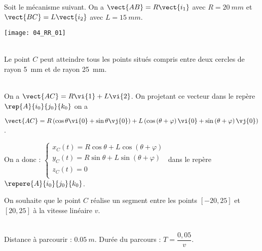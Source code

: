 \normaltrue
\correctionfalse


\setcounter{question}{0}
\ifcorrection
\else
{}
\fi

\ifprof
\else
Soit le mécanisme suivant. On a $\vect{AB}=R\vect{i_1}$ avec $R=\SI{20}{mm}$ et  
$\vect{BC}=L\vect{i_2}$ avec $L=\SI{15}{mm}$.
\begin{center}
\texttt{[image: 04\_RR\_01]}
\end{center}
\fi

\ifprof~\\
Le point $C$ peut atteindre tous les points situés compris entre deux cercles de rayon \SI{5}{mm} et de rayon \SI{25}{mm}.
\else
\fi

\ifprof~\\
On  a $\vect{AC}=R\vi{1}+L\vi{2}$. On projetant ce vecteur dans le repère $\rep{A}{i_0}{j_0}{k_0}$ on a 

$\vect{AC}=R\left(\cos\theta \vi{0} + \sin\theta \vj{0}\right) +L\left(\cos\left(\theta+\varphi\right) \vi{0} + \sin\left(\theta+\varphi\right) \vj{0}\right)$. 

On a donc :
$\left\{
\begin{array}{l}
x_C(t)= R\cos\theta  +L\cos\left(\theta+\varphi\right)  \\
y_C(t)= R \sin\theta + L\sin\left(\theta+\varphi\right)\\
z_C(t)= 0\\
\end{array}
\right.
$ dans le repère $\repere{A}{i_0}{j_0}{k_0}$.
\else
\fi

\ifprof
\else
On souhaite que le point $C$ réalise un segment entre les points $[-20,25]$ et $[20,25]$ à la vitesse linéaire $v$. 
\fi


\ifprof ~\\
Distance à parcourir : $\SI{0,05}{m}$. Durée du parcours : $T=\dfrac{0,05}{v}$.
\else
\fi


